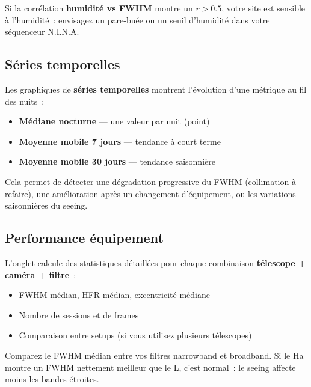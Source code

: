 \documentclass[a4paper,11pt]{article}
\begin{document}
\begin{tipbox}
Si la corr\'{e}lation \textbf{humidit\'{e} vs FWHM} montre un $r > 0.5$, votre site est sensible \`{a} l'humidit\'{e}~: envisagez un pare-bu\'{e}e ou un seuil d'humidit\'{e} dans votre s\'{e}quenceur N.I.N.A.
\end{tipbox}

\subsection{S\'{e}ries temporelles}

Les graphiques de \textbf{s\'{e}ries temporelles} montrent l'\'{e}volution d'une m\'{e}trique au fil des nuits~:

\begin{itemize}
    \item \textbf{M\'{e}diane nocturne} --- une valeur par nuit (point)
    \item \textbf{Moyenne mobile 7 jours} --- tendance \`{a} court terme
    \item \textbf{Moyenne mobile 30 jours} --- tendance saisonni\`{e}re
\end{itemize}

Cela permet de d\'{e}tecter une d\'{e}gradation progressive du FWHM (collimation \`{a} refaire), une am\'{e}lioration apr\`{e}s un changement d'\'{e}quipement, ou les variations saisonni\`{e}res du seeing.

\subsection{Performance \'{e}quipement}

L'onglet calcule des statistiques d\'{e}taill\'{e}es pour chaque combinaison \textbf{t\'{e}lescope + cam\'{e}ra + filtre}~:

\begin{itemize}
    \item FWHM m\'{e}dian, HFR m\'{e}dian, excentricit\'{e} m\'{e}diane
    \item Nombre de sessions et de frames
    \item Comparaison entre setups (si vous utilisez plusieurs t\'{e}lescopes)
\end{itemize}

\begin{notebox}
Comparez le FWHM m\'{e}dian entre vos filtres narrowband et broadband. Si le Ha montre un FWHM nettement meilleur que le L, c'est normal~: le seeing affecte moins les bandes \'{e}troites.
\end{notebox}
\end{document}

